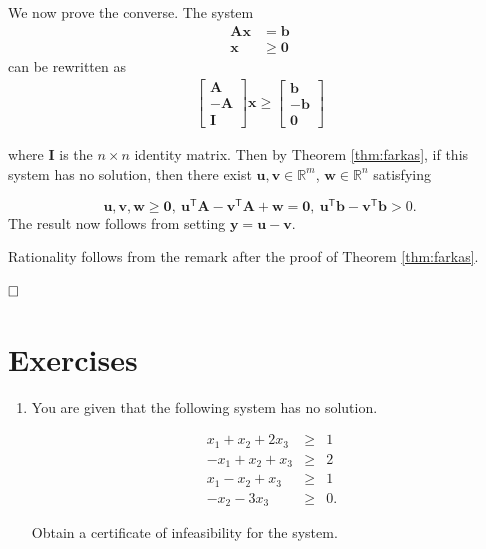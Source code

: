 \documentclass[]{book}
\providecommand{\tightlist}{%
  \setlength{\itemsep}{0pt}\setlength{\parskip}{0pt}}
\def\gt{>}
\newcommand{\T}{\mathsf{T}}
\newcommand{\mm}[1]{\mathbf{#1}}
\renewcommand{\vec}[1]{\mathbf{#1}}
\theoremstyle{definition}
\theoremstyle{definition}
\theoremstyle{remark}
\begin{document}
We now prove the converse. The system
\begin{align*}
\mm{A}\vec{x} & = \vec{b} \\
\vec{x} & \geq \vec{0}
\end{align*}
can be rewritten as
\begin{align*}
\begin{bmatrix}
\mm{A} \\
-\mm{A} \\
\mm{I}
\end{bmatrix}\vec{x} \geq 
\begin{bmatrix}
\vec{b} \\
-\vec{b} \\
\vec{0}
\end{bmatrix}
\end{align*}

where \(\mm{I}\) is the \(n\times n\) identity matrix. Then by Theorem
\ref{thm:farkas}, if this system has no solution, then there exist
\(\vec{u}, \vec{v} \in \mathbb{R}^m\), \(\vec{w} \in \mathbb{R}^n\)
satisfying

\[\vec{u},\vec{v},\vec{w} \geq \vec{0},~
\mathbf{u}^\T\mm{A} -
\mathbf{v}^\T\mm{A} +
\mathbf{w} = \mathbf{0},~
\mathbf{u}^\T\mathbf{b} -
\mathbf{v}^\T\mathbf{b} \gt 0.
\] The result now follows from setting \(\vec{y} = \vec{u} - \vec{v}\).

Rationality follows from the remark after the proof of Theorem
\ref{thm:farkas}.

\(\qed\)

\section*{Exercises}\label{exercises-4}

\begin{enumerate}
\def\labelenumi{\arabic{enumi}.}
\tightlist
\item
  You are given that the following system has no solution.

  \begin{eqnarray*}
  x_1 + x_2 + 2x_3& \geq & 1 \\
  -x_1 + x_2 + x_3 & \geq & 2 \\
  x_1-x_2 + x_3  & \geq & 1 \\
  -x_2 - 3x_3 & \geq & 0.
  \end{eqnarray*}

  Obtain a certificate of infeasibility for the system.
\end{enumerate}
\end{document}
